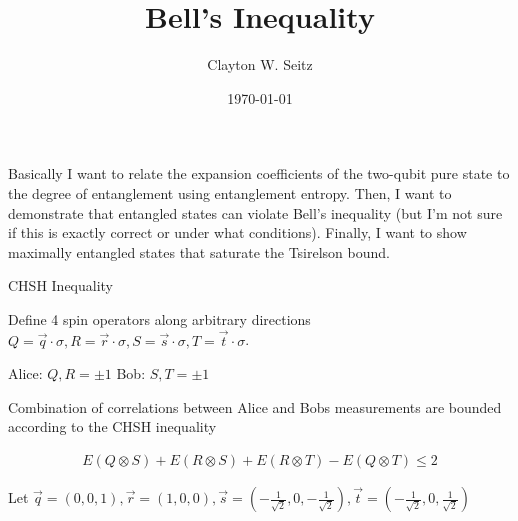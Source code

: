 \documentclass[aspectratio=1610]{beamer}					%
\title{Bell's Inequality}	%
\author{Clayton W. Seitz}								%
\date{\today}									%
\begin{document}
\begin{frame}
  \titlepage
\end{frame}

\begin{frame}{}

Basically I want to relate the expansion coefficients of the two-qubit pure state to the degree of entanglement using entanglement entropy. Then, I want to demonstrate that entangled states can violate Bell's inequality (but I'm not sure if this is exactly correct or under what conditions). Finally, I want to show maximally entangled states that saturate the Tsirelson bound.

\end{frame}

\begin{frame}{CHSH Inequality}

Define 4 spin operators along arbitrary directions $Q = \vec{q}\cdot\sigma, R = \vec{r}\cdot\sigma, S = \vec{s}\cdot\sigma, T = \vec{t}\cdot\sigma$.

\vspace{0.2in}

Alice: $Q,R = \pm 1$
Bob: $S, T = \pm 1$

\vspace{0.1in}
Combination of correlations between Alice and Bobs measurements are bounded according to the CHSH inequality

\begin{align*}
E(Q\otimes S) + E(R\otimes S) + E(R\otimes T) - E(Q\otimes T) \leq 2
\end{align*}

Let $\vec{q} = (0,0,1), \vec{r} = (1,0,0), \vec{s} = (-\frac{1}{\sqrt{2}},0,-\frac{1}{\sqrt{2}}), \vec{t} = (-\frac{1}{\sqrt{2}},0,\frac{1}{\sqrt{2}})$

\end{frame}
\end{document}

